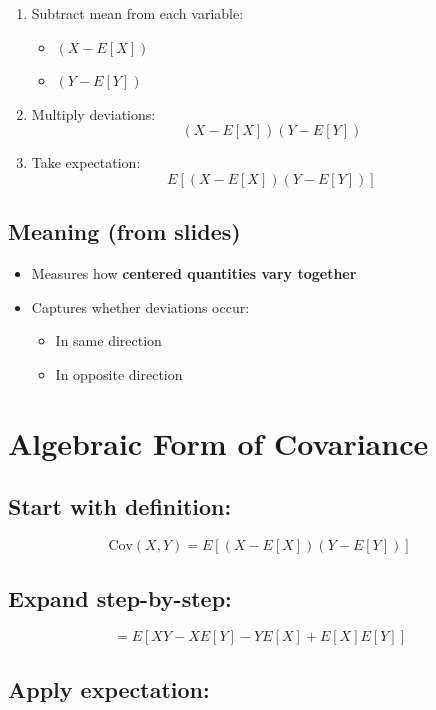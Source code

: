\documentclass[12pt]{article}
\begin{document}
\begin{enumerate}
    \item Subtract mean from each variable:
    \begin{itemize}
        \item $(X - E[X])$
        \item $(Y - E[Y])$
    \end{itemize}
    \item Multiply deviations:
    \[
    (X - E[X])(Y - E[Y])
    \]
    \item Take expectation:
    \[
    E[(X - E[X])(Y - E[Y])]
    \]
\end{enumerate}

\subsection*{Meaning (from slides)}

\begin{itemize}
    \item Measures how \textbf{centered quantities vary together}
    \item Captures whether deviations occur:
    \begin{itemize}
        \item In same direction
        \item In opposite direction
    \end{itemize}
\end{itemize}

\section{Algebraic Form of Covariance}

\subsection*{Start with definition:}

\[
\text{Cov}(X,Y) = E[(X - E[X])(Y - E[Y])]
\]

\subsection*{Expand step-by-step:}

\[
= E[XY - X E[Y] - Y E[X] + E[X]E[Y]]
\]

\subsection*{Apply expectation:}
\end{document}
